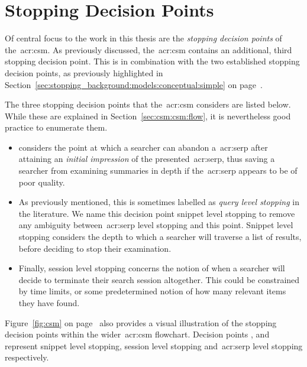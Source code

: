 \section{Stopping Decision Points}\label{sec:csm:csm:stopping}
Of central focus to the work in this thesis are the \emph{stopping decision points} of the~\gls{acr:csm}. As previously discussed, the~\gls{acr:csm} contains an additional, third stopping decision point. This is in combination with the two established stopping decision points, as previously highlighted in Section~\ref{sec:stopping_background:models:conceptual:simple} on page~\pageref{sec:stopping_background:models:conceptual:simple}.

The three stopping decision points that the~\gls{acr:csm} considers are listed below. While these are explained in Section~\ref{sec:csm:csm:flow}, it is nevertheless good practice to enumerate them.

\begin{itemize}
    
    \item{ considers the point at which a searcher can abandon a~\gls{acr:serp} after attaining an \emph{initial impression} of the presented~\gls{acr:serp}, thus saving a searcher from examining summaries in depth if the~\gls{acr:serp} appears to be of poor quality.}
    
    \item{ As previously mentioned, this is sometimes labelled as \emph{query level stopping} in the literature. We name this decision point snippet level stopping to remove any ambiguity between~\gls{acr:serp} level stopping and this point. Snippet level stopping considers the depth to which a searcher will traverse a list of results, before deciding to stop their examination.}
    
    \item{ Finally, session level stopping concerns the notion of when a searcher will decide to terminate their search session altogether. This could be constrained by time limits, or some predetermined notion of how many relevant items they have found.}
    
\end{itemize}

Figure~\ref{fig:csm} on page~\pageref{fig:csm} also provides a visual illustration of the stopping decision points within the wider~\gls{acr:csm} flowchart. Decision points ,  and  represent snippet level stopping, session level stopping and~\gls{acr:serp} level stopping respectively.

